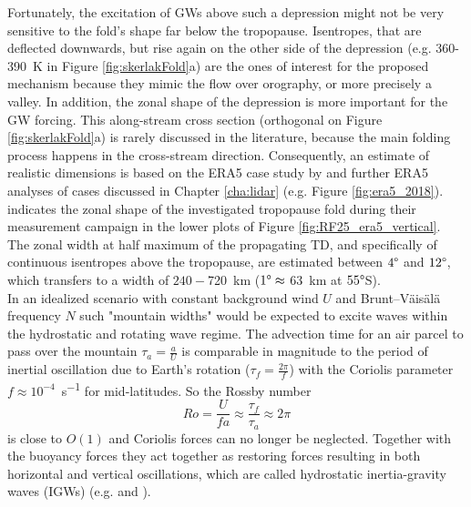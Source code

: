 Fortunately, the excitation of GWs above such a depression might not be very sensitive to the fold's shape far below the tropopause. Isentropes, that are deflected downwards, but rise again on the other side of the depression (e.g. 360-\SI{390}{\kelvin} in Figure \ref{fig:skerlakFold}a) are the ones of interest for the proposed mechanism because they mimic the flow over orography, or more precisely a valley. In addition, the zonal shape of the depression is more important for the GW forcing. This along-stream cross section (orthogonal on Figure \ref{fig:skerlakFold}a) is rarely discussed in the literature, because the main folding process happens in the cross-stream direction. Consequently, an estimate of realistic dimensions is based on the ERA5 case study by \textcite{dornbrack_stratospheric_2022} and further ERA5 analyses of cases discussed in Chapter \ref{cha:lidar} (e.g. Figure \ref{fig:era5_2018}). \textcite{dornbrack_stratospheric_2022} indicates the zonal shape of the investigated tropopause fold during their measurement campaign in the lower plots of Figure \ref{fig:RF25_era5_vertical}. The zonal width at half maximum of the propagating TD, and specifically of continuous isentropes above the tropopause, are estimated between $4 \degree$ and $12 \degree$, which transfers to a width of $240-$\SI{720}{\kilo\meter} ($1\degree \approx$ \SI{63}{\kilo\meter} at $55 \degree$S). \\
In an idealized scenario with constant background wind $U$ and Brunt–Väisälä frequency $N$ such "mountain widths" would be expected to excite waves within the hydrostatic and rotating wave regime. The advection time for an air parcel to pass over the mountain $\tau_a = \frac{a}{U}$ is comparable in magnitude to the period of inertial oscillation due to Earth’s rotation ($\tau_f = \frac{2 \pi}{f}$) with the Coriolis parameter $f \approx 10^{-4}$\SI{}{\second^{-1}} for mid-latitudes. So the Rossby number
\begin{equation}
    Ro = \frac{U}{f a} \approx \frac{\tau_f}{\tau_a} \approx 2 \pi
\end{equation}
%
is close to $O(1)$ and Coriolis forces can no longer be neglected. Together with the buoyancy forces they act together as restoring forces resulting in both horizontal and vertical oscillations, which are called hydrostatic inertia-gravity waves (IGWs) (e.g. \cite{gill_atmosphere-ocean_1982} and \cite{lin_mesoscale_2007}).

